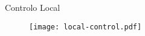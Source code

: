 \begin{frame}{Controlo Local}
	\begin{figure}
		\centering
		\texttt{[image: local-control.pdf]}
	\end{figure}
\end{frame}